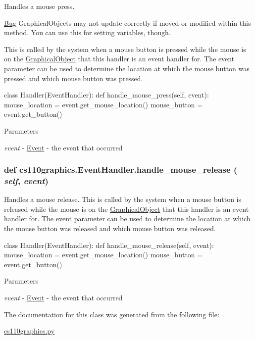 Handles a mouse press. \begin{Desc}
\item[\hyperlink{bug__bug000002}{Bug}]GraphicalObjects may not update correctly if moved or modified within this method. You can use this for setting variables, though.\end{Desc}
This is called by the system when a mouse button is pressed while the mouse is on the \hyperlink{classcs110graphics_1_1GraphicalObject}{GraphicalObject} that this handler is an event handler for. The event parameter can be used to determine the location at which the mouse button was pressed and which mouse button was pressed. 
\begin{DoxyCode}
 class Handler(EventHandler):
     def handle_mouse_press(self, event):
         mouse_location = event.get_mouse_location()
         mouse_button = event.get_button()
\end{DoxyCode}
 
\begin{DoxyParams}{Parameters}
\item[{\em event}]-\/ \hyperlink{classcs110graphics_1_1Event}{Event} -\/ the event that occurred \end{DoxyParams}
\hypertarget{classcs110graphics_1_1EventHandler_a320a7dbf68d37e0101b237bff1713088}{
\subsubsection[{handle\_\-mouse\_\-release}]{\setlength{\rightskip}{0pt plus 5cm}def cs110graphics.EventHandler.handle\_\-mouse\_\-release ( {\em self}, \/   {\em event})}}
\label{classcs110graphics_1_1EventHandler_a320a7dbf68d37e0101b237bff1713088}


Handles a mouse release. This is called by the system when a mouse button is released while the mouse is on the \hyperlink{classcs110graphics_1_1GraphicalObject}{GraphicalObject} that this handler is an event handler for. The event parameter can be used to determine the location at which the mouse button was released and which mouse button was released. 
\begin{DoxyCode}
 class Handler(EventHandler):
     def handle_mouse_release(self, event):
         mouse_location = event.get_mouse_location()
         mouse_button = event.get_button()
\end{DoxyCode}
 
\begin{DoxyParams}{Parameters}
\item[{\em event}]-\/ \hyperlink{classcs110graphics_1_1Event}{Event} -\/ the event that occurred \end{DoxyParams}


The documentation for this class was generated from the following file:\begin{DoxyCompactItemize}
\item 
\hyperlink{cs110graphics_8py}{cs110graphics.py}\end{DoxyCompactItemize}
